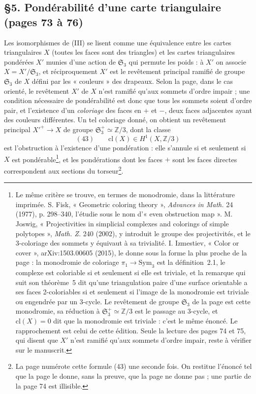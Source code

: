 \documentclass[11pt,a4paper]{article}
\begin{document}
\subsection*{§5. Pondérabilité d'une carte triangulaire (pages 73 à 76)}

Les isomorphismes de (III) se lisent comme une équivalence entre les cartes
triangulaires $X$ (toutes les faces sont des triangles) et les cartes
triangulaires pondérées $X'$ munies d'une action de $\mathfrak{S}_3$ qui
permute les poids : à $X'$ on associe $X = X'/\mathfrak{S}_3$, et
réciproquement $X'$ est le revêtement principal ramifié de groupe
$\mathfrak{S}_3$ de $X$ défini par les « couleurs » des drapeaux. Selon la
page, dans le cas orienté, le revêtement $X'$ de $X$ n'est ramifié qu'aux
sommets d'ordre impair ; une condition nécessaire de pondérabilité est donc
que tous les sommets soient d'ordre pair, et l'existence d'un
\emph{coloriage} des faces en $+$ et $-$, deux faces adjacentes ayant des
couleurs différentes. Un tel coloriage donné, on obtient un revêtement
principal $X'^{+} \to X$ de groupe $\mathfrak{S}_3^{+} \simeq \mathbb{Z}/3$, dont
la classe
\[
(43)\qquad \mathrm{cl}(X) \in H^1(X, \mathbb{Z}/3)
\]
est l'obstruction à l'existence d'une pondération : elle s'annule si et
seulement si $X$ est pondérable\footnote{Le même critère se trouve, en termes
de monodromie, dans la littérature imprimée. S. Fisk, « Geometric coloring
theory », \emph{Advances in Math.} 24 (1977), p. 298--340, l'étudie sous le nom
d'« even obstruction map ». M. Joswig, « Projectivities in simplicial complexes
and colorings of simple polytopes », \emph{Math. Z.} 240 (2002), y introduit le
groupe des projectivités, et le 3-coloriage des sommets y équivaut à sa
trivialité. I. Izmestiev, « Color or cover », arXiv:1503.00605 (2015), le donne
sous la forme la plus proche de la page : la monodromie de coloriage
$\pi_1 \to \mathrm{Sym}_3$ est la définition~2.1, le complexe est coloriable si
et seulement si elle est triviale, et la remarque qui suit son théorème~5 dit
qu'une triangulation paire d'une surface orientable a ses faces 2-coloriables
si et seulement si l'image de la monodromie est triviale ou engendrée par un
3-cycle. Le revêtement de groupe $\mathfrak{S}_3$ de la page est cette
monodromie, sa réduction à $\mathfrak{S}_3^{+} \simeq \mathbb{Z}/3$ est le
passage au 3-cycle, et $\mathrm{cl}(X) = 0$ dit que la monodromie est triviale :
c'est le même énoncé. Le rapprochement est celui de cette édition. Seule la
lecture des pages 74 et 75, qui disent que $X'$ n'est ramifié qu'aux sommets
d'ordre impair, reste à vérifier sur le manuscrit.}, et les pondérations dont les faces $+$ sont
les faces directes correspondent aux sections du torseur\footnote{La page
numérote cette formule (43) une seconde fois. On restitue l'énoncé tel que la
page le donne, sans la preuve, que la page ne donne pas ; une partie de la
page 74 est illisible.}.
\end{document}
